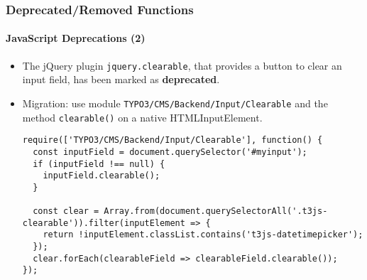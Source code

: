 
\begin{frame}[fragile]
	\frametitle{Deprecated/Removed Functions}
	\framesubtitle{JavaScript Deprecations (2)}

	\lstset{basicstyle=\tiny\ttfamily}

	\begin{itemize}
		\item The jQuery plugin \texttt{jquery.clearable},
			that provides a button to clear an input field, has been marked as \textbf{deprecated}.
		\item Migration: use module \small\texttt{TYPO3/CMS/Backend/Input/Clearable}\normalsize
			and the method \texttt{clearable()} on a native HTMLInputElement.

\begin{lstlisting}
require(['TYPO3/CMS/Backend/Input/Clearable'], function() {
  const inputField = document.querySelector('#myinput');
  if (inputField !== null) {
    inputField.clearable();
  }

  const clear = Array.from(document.querySelectorAll('.t3js-clearable')).filter(inputElement => {
    return !inputElement.classList.contains('t3js-datetimepicker');
  });
  clear.forEach(clearableField => clearableField.clearable());
});
\end{lstlisting}

	\end{itemize}

\end{frame}


